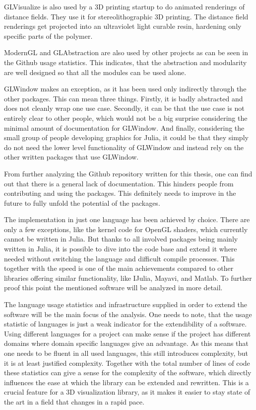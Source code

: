 GLVisualize is also used by a 3D printing startup\cite{AddSub} to do animated renderings of distance fields.
They use it for stereolithographic 3D printing. 
The distance field renderings get projected into an ultraviolet light curable resin, hardening only specific parts of the polymer.

ModernGL and GLAbstraction are also used by other projects as can be seen in the Github usage statistics.
This indicates, that the abstraction and modularity are well designed so that all the modules can be used alone.

GLWindow makes an exception, as it has been used only indirectly through the other packages. 
This can mean three things.
Firstly, it is badly abstracted and does not cleanly wrap one use case.
Secondly, it can be that the use case is not entirely clear to other people, which would not be a big surprise considering the minimal amount of documentation for GLWindow.
And finally, considering the small group of people developing graphics for Julia, it could be that they simply do not need the lower level functionality of GLWindow and instead rely on the other written packages that use GLWindow.

From further analyzing the Github repository written for this thesis, one can find out that there is a general lack of documentation.
This hinders people from contributing and using the packages. This definitely needs to improve in the future to fully unfold the potential of the packages.

The implementation in just one language has been achieved by choice. 
There are only a few exceptions, like the kernel code for OpenGL shaders, which currently cannot be written in Julia.
But thanks to all involved packages being mainly written in Julia, it is possible to dive into the code base and extend it where needed without switching the language and difficult compile processes.
This together with the speed is one of the main achievements compared to other libraries offering similar functionality, like IJulia, Mayavi, and Matlab.
To further proof this point the mentioned software will be analyzed in more detail.

The language usage statistics and infrastructure supplied in order to extend the software will be the main focus of the analysis.
One needs to note, that the usage statistic of languages is just a weak indicator for the extendibility of a software.
Using different languages for a project can make sense if the project has different domains where domain specific languages give an advantage. 
As this means that one needs to be fluent in all used languages, this still introduces complexity, but it is at least justified complexity.
Together with the total number of lines of code these statistics can give a sense for the complexity of the software, which directly influences the ease at which the library can be extended and rewritten.
This is a crucial feature for a 3D visualization library, as it makes it easier to stay state of the art in a field that changes in a rapid pace.

